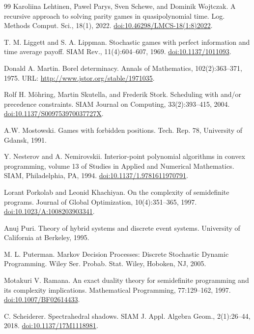 \documentclass[10pt,a4paper]{article}
\theoremstyle{definition}
\begin{document}
\begin{thebibliography}{99}
 Karoliina Lehtinen, Pawel Parys, Sven Schewe, and Dominik Wojtczak. A recursive approach to solving parity games in quasipolynomial time. Log. Methods Comput. Sci., 18(1), 2022. \href{https://doi.org/10.46298/LMCS-18(1:8)2022}{doi:10.46298/LMCS-18(1:8)2022}.

 T. M. Liggett and S. A. Lippman. Stochastic games with perfect information and time average payoff. SIAM Rev., 11(4):604–607, 1969. \href{https://doi.org/10.1137/1011093}{doi:10.1137/1011093}.

 Donald A. Martin. Borel determinacy. Annals of Mathematics, 102(2):363–371, 1975. URL: \href{http://www.jstor.org/stable/1971035}{http://www.jstor.org/stable/1971035}.

 Rolf H. Möhring, Martin Skutella, and Frederik Stork. Scheduling with and/or precedence constraints. SIAM Journal on Computing, 33(2):393–415, 2004. \href{https://doi.org/10.1137/S009753970037727X}{doi:10.1137/S009753970037727X}.

 A.W. Mostowski. Games with forbidden positions. Tech. Rep. 78, University of Gdansk, 1991.

 Y. Nesterov and A. Nemirovskii. Interior-point polynomial algorithms in convex programming, volume 13 of Studies in Applied and Numerical Mathematics. SIAM, Philadelphia, PA, 1994. \href{https://doi.org/10.1137/1.9781611970791}{doi:10.1137/1.9781611970791}.

 Lorant Porkolab and Leonid Khachiyan. On the complexity of semidefinite programs. Journal of Global Optimization, 10(4):351–365, 1997. \href{https://doi.org/10.1023/A:1008203903341}{doi:10.1023/A:1008203903341}.

 Anuj Puri. Theory of hybrid systems and discrete event systems. University of California at Berkeley, 1995.

 M. L. Puterman. Markov Decision Processes: Discrete Stochastic Dynamic Programming. Wiley Ser. Probab. Stat. Wiley, Hoboken, NJ, 2005.

 Motakuri V. Ramana. An exact duality theory for semidefinite programming and its complexity implications. Mathematical Programming, 77:129–162, 1997. \href{https://doi.org/10.1007/BF02614433}{doi:10.1007/BF02614433}.

 C. Scheiderer. Spectrahedral shadows. SIAM J. Appl. Algebra Geom., 2(1):26–44, 2018. \href{https://doi.org/10.1137/17M1118981}{doi:10.1137/17M1118981}.


\end{thebibliography}
\end{document}
